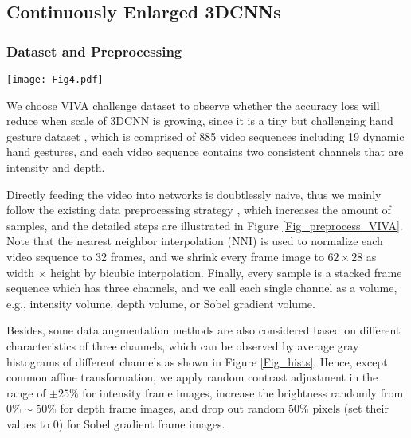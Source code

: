 \documentclass[a4paper,fleqn]{cas-dc}
\begin{document}
\subsection{Continuously Enlarged 3DCNNs}

\subsubsection{Dataset and Preprocessing}\quad

\begin{figure*}
\centering
\texttt{[image: Fig4.pdf]}
\caption{\textbf{Data preprocessing for VIVA challenge dataset.} Note that not all samples can be processed in Step c because a minority of dynamic gestures do not have characteristic of time symmetry. All the frame images shown here are from the video with the serial number ``02\_01\_03'' in original dataset.}
\label{Fig_preprocess_VIVA}
\end{figure*}

We choose VIVA challenge dataset to observe whether the accuracy loss will reduce when scale of 3DCNN is growing, since it is a tiny but challenging hand gesture dataset \citep{Ohn-Bar_2014_VIVA,Molchanov_2015_3DCNN_1}, which is comprised of 885 video sequences including 19 dynamic hand gestures, and each video sequence contains two consistent channels that are intensity and depth.

Directly feeding the video into networks is doubtlessly naive, thus we mainly follow the existing data preprocessing strategy \citep{Molchanov_2015_3DCNN_1}, which increases the amount of samples, and the detailed steps are illustrated in Figure \ref{Fig_preprocess_VIVA}. Note that the nearest neighbor interpolation (NNI) \citep{Molchanov_2015_3DCNN_1} is used to normalize each video sequence to 32 frames, and we shrink every frame image to \(62 \times 28\) as width \(\times\) height by bicubic interpolation. Finally, every sample is a stacked frame sequence which has three channels, and we call each single channel as a volume, e.g., intensity volume, depth volume, or Sobel gradient volume.

Besides, some data augmentation methods are also considered based on different characteristics of three channels, which can be observed by average gray histograms of different channels as shown in Figure \ref{Fig_hists}. Hence, except common affine transformation, we apply random contrast adjustment in the range of \(\pm 25\%\) for intensity frame images, increase the brightness randomly from \(0\% \sim 50\%\) for depth frame images, and drop out random \(50\%\) pixels (set their values to 0) for Sobel gradient frame images.
\end{document}
